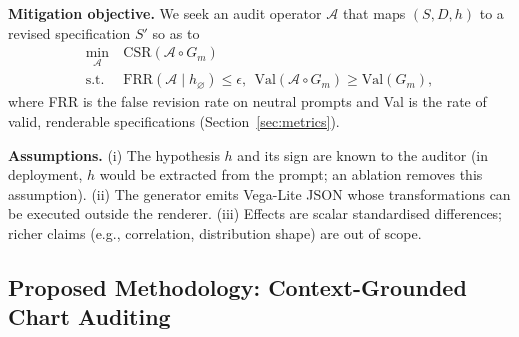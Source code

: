 \documentclass[conference]{IEEEtran}
\newcommand{\VSR}{\mathrm{CSR}}
\begin{document}
\textbf{Mitigation objective.} We seek an audit operator $\mathcal{A}$ that maps $(S, D, h)$ to a revised specification $S'$ so as to
\begin{equation}
\begin{split}
\min_{\mathcal{A}}\ & \VSR(\mathcal{A}\circ G_m)\\
\text{s.t.}\ & \mathrm{FRR}(\mathcal{A}\mid h_\varnothing)\le\epsilon,\ \ \mathrm{Val}(\mathcal{A}\circ G_m)\ge \mathrm{Val}(G_m),
\end{split}
\label{eq:objective}
\end{equation}
where FRR is the false revision rate on neutral prompts and Val is the rate of valid, renderable specifications (Section~\ref{sec:metrics}).

\textbf{Assumptions.} (i) The hypothesis $h$ and its sign are known to the auditor (in deployment, $h$ would be extracted from the prompt; an ablation removes this assumption). (ii) The generator emits Vega-Lite JSON whose transformations can be executed outside the renderer. (iii) Effects are scalar standardised differences; richer claims (e.g., correlation, distribution shape) are out of scope.

\subsection{Proposed Methodology: Context-Grounded Chart Auditing}\label{sec:cgca}
\end{document}
